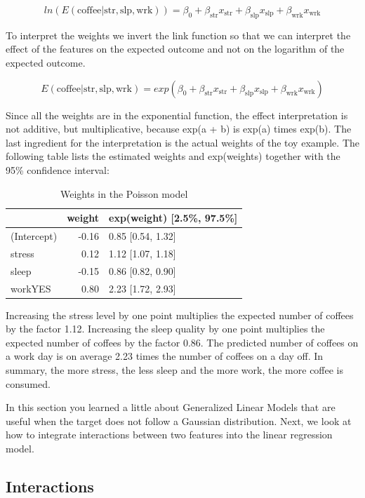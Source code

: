 \documentclass[
  11pt,
]{scrbook}
\begin{document}
\[ln(E(\text{coffee}|\text{str},\text{slp},\text{wrk}))=\beta_0+\beta_{\text{str}}x_{\text{str}}+\beta_{\text{slp}}x_{\text{slp}}+\beta_{\text{wrk}}x_{\text{wrk}}\]

To interpret the weights we invert the link function so that we can interpret the effect of the features on the expected outcome and not on the logarithm of the expected outcome.

\[E(\text{coffee}|\text{str},\text{slp},\text{wrk})=exp(\beta_0+\beta_{\text{str}}x_{\text{str}}+\beta_{\text{slp}}x_{\text{slp}}+\beta_{\text{wrk}}x_{\text{wrk}})\]

Since all the weights are in the exponential function, the effect interpretation is not additive, but multiplicative, because exp(a + b) is exp(a) times exp(b).
The last ingredient for the interpretation is the actual weights of the toy example.
The following table lists the estimated weights and exp(weights) together with the 95\% confidence interval:

\begin{table}

\caption{\label{tab:poisson-model-params}Weights in the Poisson model}
\centering
\begin{tabular}[t]{lrl}
\toprule
  & weight & exp(weight) [2.5\%, 97.5\%]\\
\midrule
(Intercept) & -0.16 & 0.85 [0.54, 1.32]\\
stress & 0.12 & 1.12 [1.07, 1.18]\\
sleep & -0.15 & 0.86 [0.82, 0.90]\\
workYES & 0.80 & 2.23 [1.72, 2.93]\\
\bottomrule
\end{tabular}
\end{table}

Increasing the stress level by one point multiplies the expected number of coffees by the factor 1.12.
Increasing the sleep quality by one point multiplies the expected number of coffees by the factor 0.86.
The predicted number of coffees on a work day is on average 2.23 times the number of coffees on a day off.
In summary, the more stress, the less sleep and the more work, the more coffee is consumed.

In this section you learned a little about Generalized Linear Models that are useful when the target does not follow a Gaussian distribution.
Next, we look at how to integrate interactions between two features into the linear regression model.

\hypertarget{lm-interact}{%
\subsection{Interactions}\label{lm-interact}}
\end{document}
